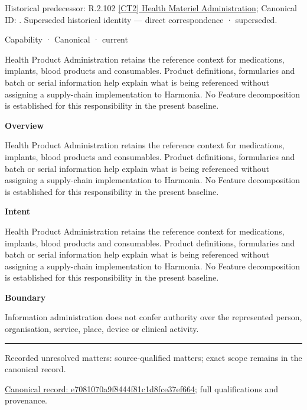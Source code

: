 {\small Historical predecessor: R.2.102 \hyperref[element:4952f86078c54a8d898ac992e6f4f577]{[CT2] Health Materiel Administration}; Canonical ID: \texttt{}. Superseded historical identity — direct correspondence · superseded.}\par
\label{element:e7081070a9f8444f81c1d8fce37ef664}
{\small Capability · Canonical · current}\par

Health Product Administration retains the reference context for medications, implants, blood products and consumables. Product definitions, formularies and batch or serial information help explain what is being referenced without assigning a supply-chain implementation to Harmonia. No Feature decomposition is established for this responsibility in the present baseline.



\textbf{Overview}



Health Product Administration retains the reference context for medications, implants, blood products and consumables. Product definitions, formularies and batch or serial information help explain what is being referenced without assigning a supply-chain implementation to Harmonia. No Feature decomposition is established for this responsibility in the present baseline.



\textbf{Intent}



Health Product Administration retains the reference context for medications, implants, blood products and consumables. Product definitions, formularies and batch or serial information help explain what is being referenced without assigning a supply-chain implementation to Harmonia. No Feature decomposition is established for this responsibility in the present baseline.



\textbf{Boundary}



Information administration does not confer authority over the represented person, organisation, service, place, device or clinical activity.



\medskip\hrule\medskip

{\small Recorded unresolved matters: source-qualified matters; exact scope remains in the canonical record.}\par
{\footnotesize \href{../../../../../../../continuum/strategy/capability/e7081070a9f8444f81c1d8fce37ef664.md}{Canonical record: e7081070a9f8444f81c1d8fce37ef664}; full qualifications and provenance.}\par
